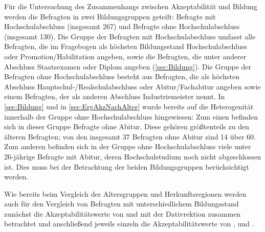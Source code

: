 Für die Untersuchung des Zusammenhangs zwischen Akzeptabilität und Bildung werden die Befragten in zwei Bildungsgruppen geteilt: Befragte mit Hochschulabschluss (insgesamt 267) und Befragte ohne Hochschulabschluss (insgesamt 130). 
Die Gruppe der Befragten mit Hochschulabschluss umfasst alle Befragten, die im Fragebogen als höchsten Bildungsstand \glqq Hochschulabschluss\grqq{} oder \glqq Promotion/Habilitation\grqq{} angeben, sowie die Befragten, die unter \glqq anderer Abschluss\grqq{} \glqq Staatsexamen\grqq{} oder \glqq Diplom\grqq{} angeben (\autoref{sec:Bildung}). 
Die Gruppe der Befragten ohne Hochschulabschluss besteht aus Befragten, die als höchsten Abschluss \glqq Hauptschul-/Realschulabschluss\grqq{} oder \glqq Abitur/Fachabitur\grqq{} angeben sowie einem Befragten, der als anderen Abschluss \glqq Industriemeister\grqq{} nennt. 
In \autoref{sec:Bildung} und in \autoref{sec:ErgAkzNachAlter} wurde bereits auf die Heterogenität innerhalb der Gruppe ohne Hochschulabschluss hingewiesen:
Zum einen befinden sich in dieser Gruppe Befragte ohne Abitur.  Diese gehören größtenteils zu den älteren Befragten; von den insgesamt 37 Befragten ohne Abitur sind 14 über 60. 
Zum anderen befinden sich in der Gruppe ohne Hochschulabschluss viele unter 26-jährige Befragte mit Abitur, deren Hochschulstudium noch nicht abgeschlossen ist. 
Dies muss bei der Betrachtung der beiden Bildungsgruppen berücksichtigt werden. 

Wie bereits beim Vergleich der Altersgruppen und Herkunftsregionen werden auch für den Vergleich von Befragten mit unterschiedlichem Bildungsstand zunächst die Akzeptabilitätswerte von \wegen{} und \waehrend{} mit der Dativrektion zusammen betrachtet und anschließend jeweils einzeln die Akzeptabilitätswerte von \dank{}, \gegenueber{} und .


